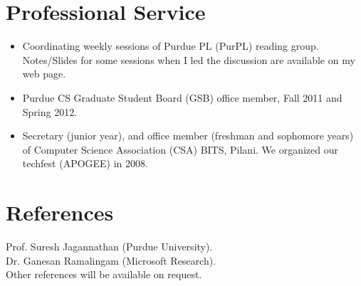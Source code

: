 \documentclass[margin,line]{res}
\begin{document}
\begin{resume}
\section {Professional Service}
\begin{itemize}
\item Coordinating weekly sessions of Purdue PL (PurPL) reading group.
Notes/Slides for some sessions when I led the discussion are available
on my web page.
\item Purdue CS Graduate Student Board (GSB) office member, Fall 2011 and
Spring 2012.
\item Secretary (junior year), and office member (freshman and sophomore
years) of Computer Science Association (CSA) BITS, Pilani. We
organized our techfest (APOGEE) in 2008. 
\end{itemize}

\section{References}
Prof. Suresh Jagannathan (Purdue University).\\
Dr. Ganesan Ramalingam (Microsoft Research). \\
Other references will be available on request.
\end{resume} 
\end{document}
